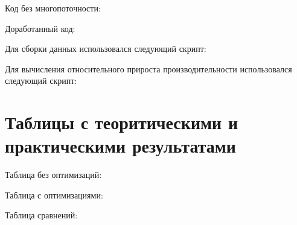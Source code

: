 \documentclass[a4paper, 12pt]{article}
\begin{document}
Код без многопоточности:

\vspace{0.5cm}

Доработанный код:

\vspace{0.5cm}

Для сборки данных использовался следующий скрипт:

\vspace{0.5cm}

Для вычисления относительного прироста производительности использовался следующий скрипт:

\vspace{0.5cm}

\section{Таблицы с теоритическими и практическими результатами}

Таблица без оптимизаций:

\vspace{0.3cm}


\vspace{0.5cm}

Таблица с оптимизациями:

\vspace{0.3cm}


\vspace{0.5cm}

Таблица сравнений:

\vspace{0.3cm}

\end{document}

